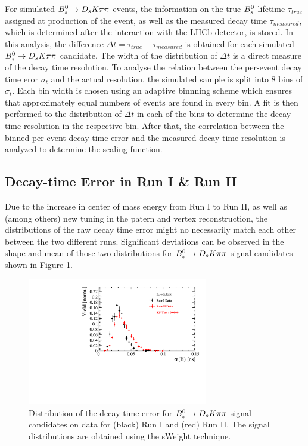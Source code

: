 For simulated ${{B}^0_{s}}\rightarrow{\ensuremath{{D}_{s}}}{\ensuremath{K}}{\ensuremath{\pi}}{\ensuremath{\pi}}$ events, the information on the true ${{B}^0_{s}}$ lifetime $\tau_{true}$ assigned at production of the event, 
as well as the measured decay time $\tau_{measured}$, which is determined after the interaction with the LHCb detector, is stored. 
In this analysis, the difference $\Delta t = \tau_{true} - \tau_{measured}$ is obtained for each simulated ${{B}^0_{s}}\rightarrow{\ensuremath{{D}_{s}}}{\ensuremath{K}}{\ensuremath{\pi}}{\ensuremath{\pi}}$ candidate. 
The width of the distribution of $\Delta t$ is a direct measure of the decay time resolution. \newline 
To analyse the relation between the per-event decay time eror $\sigma_{t}$ and the actual resolution, the simulated sample is split into 8 bins of $\sigma_{t}$. 
Each bin width is chosen using an adaptive binnning scheme which ensures that approximately equal numbers of events are found in every bin.  
A fit is then performed to the distribution of $\Delta t$ in each of the bins to determine the decay time resolution in the respective bin. 
After that, the correlation between the binned per-event decay time error and the measured decay time resolution is analyzed to determine the scaling function.     


\subsection{Decay-time Error in Run I \& Run II}

Due to the increase in center of mass energy from Run I to Run II, as well as (among others) new tuning in the patern and vertex reconstruction, 
the distributions of the raw decay time error might no necessarily match each other between the two different runs. 
Significant deviations can be observed in the shape and mean of those two distributions for ${{B}^0_{s}}\rightarrow{\ensuremath{{D}_{s}}}{\ensuremath{K}}{\ensuremath{\pi}}{\ensuremath{\pi}}$ signal candidates shown in Figure \ref{fig:Bs_DTFERR_Comp}.

\begin{figure}[h]
\centering
\includegraphics[height=!,width=0.7\textwidth]{figs/dataVsMC/run1vs2_signal/Ds2all_Bs_DTF_TAUERR.pdf}
\caption{Distribution of the decay time error for ${{B}^0_{s}}\rightarrow{\ensuremath{{D}_{s}}}{\ensuremath{K}}{\ensuremath{\pi}}{\ensuremath{\pi}}$ signal candidates on data for (black) Run I and (red) Run II. The signal distributions are obtained using the sWeight technique.}
\label{fig:Bs_DTFERR_Comp}
\end{figure}

